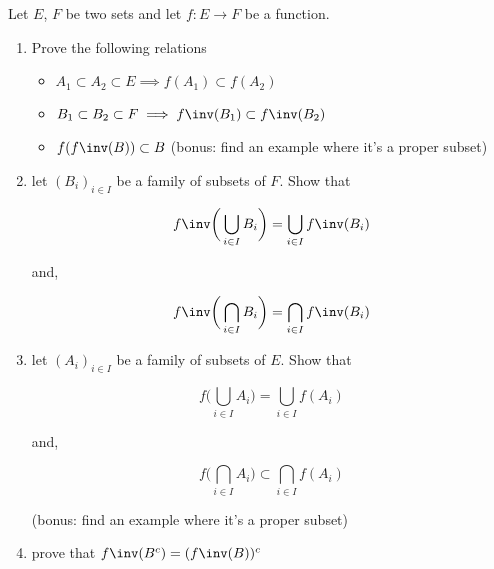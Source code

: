 \documentclass{pset}
\begin{document}
\begin{problem}
    Let $E$, $F$ be two sets and let $f\colon E\longrightarrow F$ be a function. 
    \begin{enumerate}
        \item Prove the following relations
        \begin{itemize}
            \item $A_1\subset A_2\subset E \implies f(A_1)\subset f(A_2)$
            \item $B_1\subset B_2\subset F \implies f\inv(B_1)\subset f\inv(B_2)$
            \item $f(f\inv(B))\subset B$ \small(bonus: find an example where it's a proper subset)
        \end{itemize}
        \item let $(B_i)_{i\in I}$ be a family of subsets of $F$. Show that
        
        \begin{minipage}{0.45\linewidth}
        \[
            f\inv\bigg(\bigcup_{i\in I} B_i\bigg) = \bigcup_{i\in I} f\inv(B_i)
        \]
        \end{minipage}
        \hfill
        and,
        \hfill
        \begin{minipage}{0.45\linewidth}
        \[
            f\inv\bigg(\bigcap_{i\in I} B_i\bigg) = \bigcap_{i\in I} f\inv(B_i)
        \]
        \end{minipage}
        \item let $(A_i)_{i\in I}$ be a family of subsets of $E$. Show that
        
        \begin{minipage}{0.45\linewidth}
        \[
            f\bigg(\bigcup_{i\in I} A_i\bigg) = \bigcup_{i\in I} f(A_i)
        \]
        \end{minipage}
        \hfill
        and,
        \hfill
        \begin{minipage}{0.45\linewidth}
        \[
            f\bigg(\bigcap_{i\in I} A_i\bigg) \subset \bigcap_{i\in I} f(A_i)
        \]
        \end{minipage}
        \noindent\small{(bonus: find an example where it's a proper subset)}
        \item \normalsize prove that $f\inv(B^c) = (f\inv(B))^c$
    \end{enumerate}
\end{problem}
\end{document}
